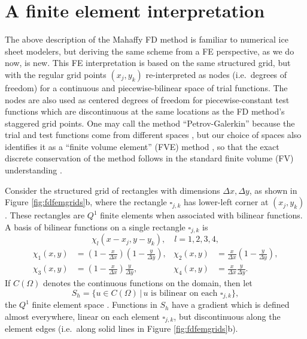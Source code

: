 \documentclass[11pt]{amsart}
\begin{document}
\section{A finite element interpretation}

The above description of the Mahaffy FD method is familiar to numerical ice sheet modelers, but deriving the same scheme from a FE perspective, as we do now, is new.  This FE interpretation is based on the same structured grid, but with the regular grid points $(x_j,y_k)$ re-interpreted as nodes (i.e.~degrees of freedom) for a continuous and piecewise-bilinear space of trial functions.  The nodes are also used as centered degrees of freedom for piecewise-constant test functions which are discontinuous at the same locations as the FD method's staggered grid points.  One may call the method ``Petrov-Galerkin'' because the trial and test functions come from different spaces \cite{Elmanetal2005}, but our choice of spaces also identifies it as a ``finite volume element'' (FVE) method \cite{EwingLinLin2002}, so that the exact discrete conservation of the method follows in the standard finite volume (FV) understanding \cite{LeVeque}.

Consider the structured grid of rectangles with dimensions $\Delta x,\Delta y$, as shown in Figure \ref{fig:fdfemgrids}b, where the rectangle $\square_{j,k}$ has lower-left corner at $(x_j,y_k)$.  These rectangles are $Q^1$ finite elements when associated with bilinear functions.  A basis of bilinear functions on a single rectangle $\square_{j,k}$ is
\begin{equation}
\chi_l(x-x_j,y-y_k), \quad l=1,2,3,4, \label{eq:elementbasis}
\end{equation}
\begin{align*}
\chi_1(x,y) &= \left(1-\tfrac{x}{\Delta x}\right) \left(1-\tfrac{y}{\Delta y}\right), & \chi_2(x,y) &= \tfrac{x}{\Delta x} \left(1-\tfrac{y}{\Delta y}\right), \\
\chi_3(x,y) &= \left(1-\tfrac{x}{\Delta x}\right) \tfrac{y}{\Delta y}, & \chi_4(x,y) &= \tfrac{x}{\Delta x} \tfrac{y}{\Delta y}. 
\end{align*}
If $C(\Omega)$ denotes the continuous functions on the domain, then let
\begin{equation}
S_h = \{u \in C(\Omega) \,\big|\, u \text{ is bilinear on each $\square_{j,k}$}\},
\end{equation}
the $Q^1$ finite element space \cite{Elmanetal2005}.  Functions in $S_h$ have a gradient which is defined almost everywhere, linear on each element $\square_{j,k}$, but discontinuous along the element edges (i.e.~along solid lines in Figure \ref{fig:fdfemgrids}b).
\end{document}
